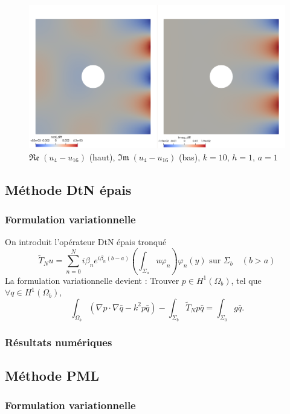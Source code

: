 \documentclass{article}
\begin{document}
\begin{figure}[h!]
    \centering
    \includegraphics[scale=0.2]{sc_DtN_1_diff.png}
    \caption{$\mathfrak{Re }\; (u_{4}-u_{16})$ (haut), $\mathfrak{Im }\; (u_{4}-u_{16})$ (bas), $k=10$, $h=1$,  $a=1$}
\end{figure}


\subsection{Méthode DtN épais}
\subsubsection{Formulation variationnelle}

On introduit l'opérateur DtN épais tronqué $$
\tilde{T}_N u=\sum_{n=0}^N i \beta_n e^{i \beta_n(b-a)}\left(\int_{\Sigma_a} u \varphi_n\right) \varphi_n(y) \text { sur } \Sigma_b \quad (b>a)
$$
La formulation variationnelle devient :
Trouver $p \in H^1\left(\Omega_b\right)$, tel que $\forall q \in H^1\left(\Omega_b\right)$,
$$
\int_{\Omega_b}\left(\nabla p \cdot \nabla \bar{q}-k^2 p \bar{q}\right)-\int_{\Sigma_b}\tilde{T}_N p\bar{q}=\int_{\Sigma_{0}} g \bar{q} .
$$ 

\subsubsection{Résultats numériques}

\subsection{Méthode PML}
\subsubsection{Formulation variationnelle}
\end{document}

